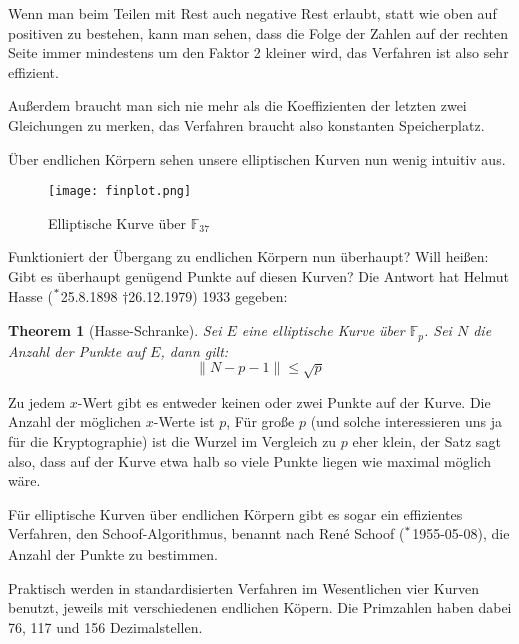 \documentclass{article}
\newcommand{\F}{\mathbb{F}}
\newcounter{thm}
\newtheorem{theorem}[thm]{Theorem}
\begin{document}
Wenn man beim Teilen mit Rest auch negative Rest erlaubt, statt wie oben auf
positiven zu bestehen, kann man sehen, dass die Folge der Zahlen auf der
rechten Seite immer mindestens um den Faktor 2 kleiner wird, das Verfahren ist
also sehr effizient.

Außerdem braucht man sich nie mehr als die Koeffizienten der letzten zwei
Gleichungen zu merken, das Verfahren braucht also konstanten Speicherplatz.
\pagebreak


Über endlichen Körpern sehen unsere elliptischen Kurven nun wenig intuitiv
aus.
\begin{figure}[h]
  \centering
  \texttt{[image: finplot.png]}
  \caption{Elliptische Kurve über $\F_{37}$}
\end{figure}

Funktioniert der Übergang zu endlichen Körpern nun überhaupt? Will heißen:
Gibt es überhaupt genügend Punkte auf diesen Kurven? Die Antwort hat Helmut
Hasse ($\strut^*$25.8.1898  $\dagger$26.12.1979) 1933 gegeben:

\begin{theorem}[Hasse-Schranke]
    Sei $E$ eine elliptische Kurve über $\F_p$. Sei $N$ die Anzahl der Punkte
    auf $E$, dann gilt:
    \begin{equation}
      \| N - p - 1 \| \le \sqrt{p}
    \end{equation}
\end{theorem}

Zu jedem $x$-Wert gibt es entweder keinen oder zwei Punkte auf der Kurve. Die Anzahl
der möglichen $x$-Werte ist $p$, Für große $p$ (und solche interessieren uns
ja für die Kryptographie) ist die Wurzel im Vergleich zu $p$ eher klein,
der Satz sagt also, dass auf der Kurve etwa halb so viele Punkte liegen wie
maximal möglich wäre.

Für elliptische Kurven über endlichen Körpern gibt es sogar ein effizientes
Verfahren, den Schoof-Algorithmus, benannt nach René Schoof ($\strut^*$1955-05-08),
die Anzahl der Punkte zu bestimmen.

Praktisch werden in standardisierten Verfahren im Wesentlichen vier Kurven
benutzt, jeweils mit verschiedenen endlichen Köpern. Die Primzahlen haben
dabei 76, 117 und 156 Dezimalstellen.
\end{document}
